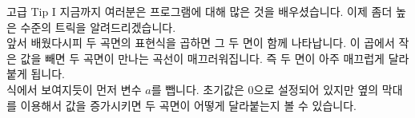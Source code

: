 ﻿\begin{surferPage}{고급 Tip I}
지금까지 여러분은 프로그램에 대해 많은 것을 배우셨습니다. 이제 좀더 높은 수준의 트릭을 알려드리겠습니다.\\
\vspace{0.3cm}
앞서 배웠다시피 두 곡면의 표현식을 곱하면 그 두 면이 함께 나타납니다. 이 곱에서 작은 값을 빼면 두 곡면이 만나는 곡선이 매끄러워집니다. 즉 두 면이 아주 매끄럽게 달라붙게 됩니다. \\
\vspace{0.3cm}
식에서 보여지듯이 먼저 변수 $a$를 뺍니다. 초기값은 $0$으로 설정되어 있지만 옆의 막대를 이용해서 값을 증가시키면 두 곡면이 어떻게 달라붙는지 볼 수 있습니다.
\end{surferPage}
